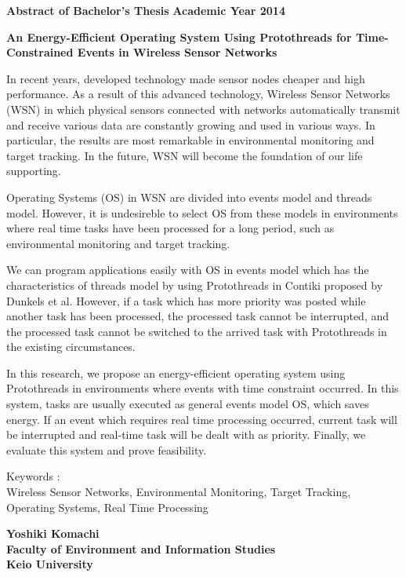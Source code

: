 \newpage

\begin{center}
\textbf{\Large Abstract of Bachelor's Thesis}
\textbf{\Large Academic Year 2014}
\vspace{6.18mm}

\textbf{\Large An Energy-Efficient Operating System Using Protothreads for Time-Constrained Events in Wireless Sensor Networks}
\end{center}

\vspace{10mm}

In recent years, 
developed technology made 
sensor nodes cheaper and high performance.
As a result of this advanced technology, 
Wireless Sensor Networks (WSN) 
in which physical sensors connected with networks
automatically transmit and receive various data 
are constantly growing and used in various ways.
In particular, the results are most remarkable
in environmental monitoring and target tracking.
In the future, WSN will become the foundation of our life supporting. 

Operating Systems (OS) in WSN
are divided into events model and threads model.
However, it is undesireble to 
select OS from these models  
in environments where 
real time tasks have been processed 
for a long period,
such as environmental monitoring and target tracking.

We can program applications easily
with OS
in events model which
has the characteristics of threads model
by using Protothreads 
in Contiki proposed by Dunkels et al.
However, 
if a task which has more priority was posted 
while another task has been processed,
the processed task cannot be interrupted,
and the processed task cannot be switched to the arrived task 
with Protothreads
in the existing circumstances.

In this research, we propose an energy-efficient operating system 
using Protothreads
in environments where events with time constraint occurred.
In this system,
tasks are usually executed as general events model OS, 
which saves energy.
If an event which requires real time processing occurred,
current task will be interrupted and 
real-time task will be dealt with as priority.
Finally, we evaluate this system and prove feasibility.


\vspace{10mm}
Keywords :\\
\hspace{3.5em}Wireless Sensor Networks, Environmental Monitoring, Target Tracking, Operating Systems, Real Time Processing 
\begin{flushright}
\textbf{Yoshiki Komachi}\\
\vspace{5mm}
\textbf{Faculty of Environment and Information Studies}\\
\textbf{Keio University}
\end{flushright}
